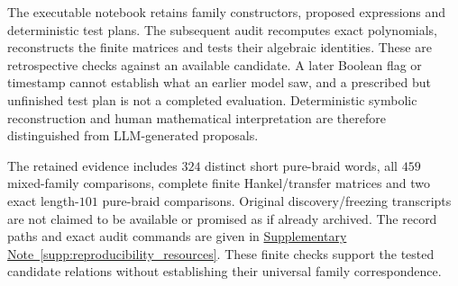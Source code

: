 \documentclass[10pt,twocolumn]{article}
\providecommand{\SuppSubsecref}[1]{\hyperref[#1]{Supplementary Note~\ref*{#1}}}
\begin{document}
The executable notebook retains family constructors, proposed expressions and deterministic test plans. The subsequent audit recomputes exact polynomials, reconstructs the finite matrices and tests their algebraic identities. These are retrospective checks against an available candidate. A later Boolean flag or timestamp cannot establish what an earlier model saw, and a prescribed but unfinished test plan is not a completed evaluation. Deterministic symbolic reconstruction and human mathematical interpretation are therefore distinguished from LLM-generated proposals.

The retained evidence includes $324$ distinct short pure-braid words, all $459$ mixed-family comparisons, complete finite Hankel/transfer matrices and two exact length-$101$ pure-braid comparisons. Original discovery/freezing transcripts are not claimed to be available or promised as if already archived. The record paths and exact audit commands are given in \SuppSubsecref{supp:reproducibility_resources}. These finite checks support the tested candidate relations without establishing their universal family correspondence.
\end{document}
